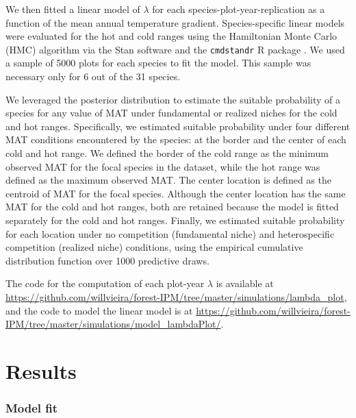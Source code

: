We then fitted a linear model of \(\lambda\) for each
species-plot-year-replication as a function of the mean annual
temperature gradient. Species-specific linear models were evaluated for
the hot and cold ranges using the Hamiltonian Monte Carlo (HMC)
algorithm via the Stan software \citep[version 2.30.1][]{stan2022stan}
and the \texttt{cmdstandr} R package \citep[version 0.5.3][]{cmdstanr}.
We used a sample of 5000 plots for each species to fit the model. This
sample was necessary only for 6 out of the 31 species.

We leveraged the posterior distribution to estimate the suitable
probability of a species for any value of MAT under fundamental or
realized niches for the cold and hot ranges. Specifically, we estimated
suitable probability under four different MAT conditions encountered by
the species: at the border and the center of each cold and hot range. We
defined the border of the cold range as the minimum observed MAT for the
focal species in the dataset, while the hot range was defined as the
maximum observed MAT. The center location is defined as the centroid of
MAT for the focal species. Although the center location has the same MAT
for the cold and hot ranges, both are retained because the model is
fitted separately for the cold and hot ranges. Finally, we estimated
suitable probability for each location under no competition (fundamental
niche) and heterospecific competition (realized niche) conditions, using
the empirical cumulative distribution function over 1000 predictive
draws.

The code for the computation of each plot-year \(\lambda\) is available
at
\url{https://github.com/willvieira/forest-IPM/tree/master/simulations/lambda_plot},
and the code to model the linear model is at
\url{https://github.com/willvieira/forest-IPM/tree/master/simulations/model_lambdaPlot/}.

\hypertarget{results}{%
\section{Results}\label{results}}

\hypertarget{model-fit}{%
\subsubsection{Model fit}\label{model-fit}}

